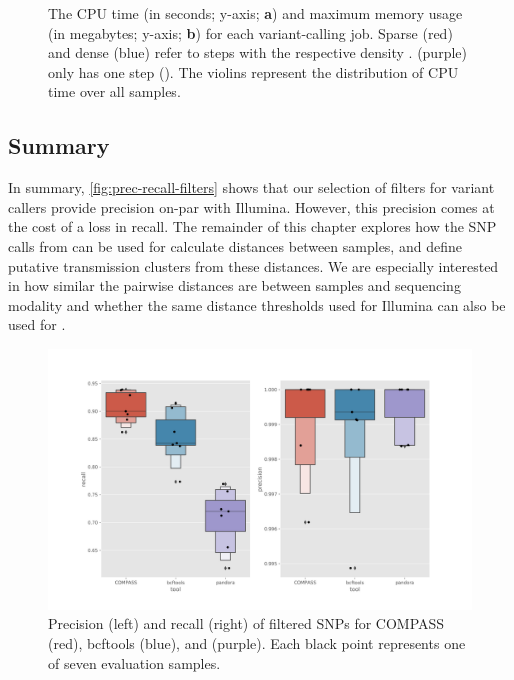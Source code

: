 \begin{figure}
\begin{subfigure}[b]{0.475\textwidth}
         \caption{}
         \label{fig:max-mem}
     \end{subfigure}
        \caption{The CPU time (in seconds; y-axis; \textbf{a}) and maximum memory usage (in megabytes; y-axis; \textbf{b}) for each \ont{} variant-calling job. Sparse (red) and dense (blue) refer to \pandora{} steps with the respective density \prg{}.  (purple) only has one step (). The violins represent the distribution of CPU time over all samples. }
        \label{fig:var-comp-perf}
\end{figure}

\subsection{Summary}
\label{sec:var-summary}

In summary, \autoref{fig:prec-recall-filters} shows that our selection of filters for \ont{} variant callers provide precision on-par with Illumina. However, this precision comes at the cost of a loss in recall. The remainder of this chapter explores how the SNP calls from \ont{} can be used for calculate distances between samples, and define putative transmission clusters from these distances. We are especially interested in how similar the pairwise distances are between samples and sequencing modality and whether the same distance thresholds used for Illumina can also be used for \ont{}.

\begin{figure}
\begin{center}
\includegraphics[width=0.9\columnwidth]{Chapter2/Figs/combined-precision-recall-filters-snps.png}
\caption{{Precision (left) and recall (right) of filtered SNPs for COMPASS (red), bcftools (blue), and \pandora{} (purple). Each black point represents one of seven evaluation samples. 
{\label{fig:prec-recall-filters}}%
}}
\end{center}
\end{figure}

